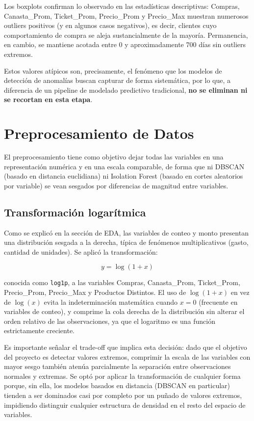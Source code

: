 \documentclass[11pt]{article}
\begin{document}
Los boxplots confirman lo observado en las estadísticas descriptivas: Compras, Canasta\_Prom,
Ticket\_Prom, Precio\_Prom y Precio\_Max muestran numerosos outliers positivos (y en algunos casos
negativos), es decir, clientes cuyo comportamiento de compra se aleja sustancialmente de la mayoría.
Permanencia, en cambio, se mantiene acotada entre 0 y aproximadamente 700 días sin outliers extremos.

Estos valores atípicos son, precisamente, el fenómeno que los modelos de detección de anomalías buscan
capturar de forma sistemática, por lo que, a diferencia de un pipeline de modelado predictivo tradicional,
\textbf{no se eliminan ni se recortan en esta etapa}.

\section*{Preprocesamiento de Datos}

El preprocesamiento tiene como objetivo dejar todas las variables en una representación numérica y en
una escala comparable, de forma que ni DBSCAN (basado en distancia euclidiana) ni Isolation Forest
(basado en cortes aleatorios por variable) se vean sesgados por diferencias de magnitud entre variables.

\subsection*{Transformación logarítmica}

Como se explicó en la sección de EDA, las variables de conteo y monto presentan una distribución sesgada
a la derecha, típica de fenómenos multiplicativos (gasto, cantidad de unidades). Se aplicó la
transformación:

\begin{equation}
y = \log(1 + x)
\end{equation}

conocida como \texttt{log1p}, a las variables Compras, Canasta\_Prom, Ticket\_Prom, Precio\_Prom, Precio\_Max y
Productos Distintos. El uso de $\log(1+x)$ en vez de $\log(x)$ evita la indeterminación matemática cuando $x = 0$
(frecuente en variables de conteo), y comprime la cola derecha de la distribución sin alterar el orden
relativo de las observaciones, ya que el logaritmo es una función estrictamente creciente.

Es importante señalar el trade-off que implica esta decisión: dado que el objetivo del proyecto es detectar
valores extremos, comprimir la escala de las variables con mayor sesgo también atenúa parcialmente la
separación entre observaciones normales y extremas. Se optó por aplicar la transformación de cualquier
forma porque, sin ella, los modelos basados en distancia (DBSCAN en particular) tienden a ser dominados
casi por completo por un puñado de valores extremos, impidiendo distinguir cualquier estructura de
densidad en el resto del espacio de variables.
\end{document}
